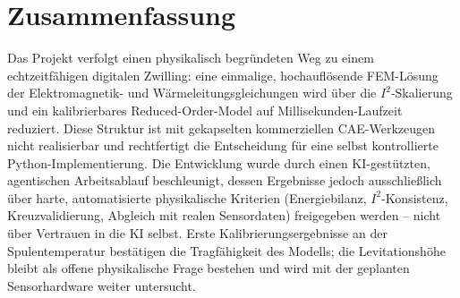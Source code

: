 \documentclass[a4paper,11pt]{article}
\begin{document}
\section{Zusammenfassung}

Das Projekt verfolgt einen physikalisch begründeten Weg zu einem
echtzeitfähigen digitalen Zwilling: eine einmalige, hochauflösende FEM-Lösung
der Elektromagnetik- und Wärmeleitungsgleichungen wird über die
$I^2$-Skalierung und ein kalibrierbares Reduced-Order-Model auf
Millisekunden-Laufzeit reduziert. Diese Struktur ist mit gekapselten
kommerziellen CAE-Werkzeugen nicht realisierbar und rechtfertigt die
Entscheidung für eine selbst kontrollierte Python-Implementierung. Die
Entwicklung wurde durch einen KI-gestützten, agentischen Arbeitsablauf
beschleunigt, dessen Ergebnisse jedoch ausschließlich über harte,
automatisierte physikalische Kriterien (Energiebilanz, $I^2$-Konsistenz,
Kreuzvalidierung, Abgleich mit realen Sensordaten) freigegeben werden --
nicht über Vertrauen in die KI selbst. Erste Kalibrierungsergebnisse an der
Spulentemperatur bestätigen die Tragfähigkeit des Modells; die
Levitationshöhe bleibt als offene physikalische Frage bestehen und wird mit
der geplanten Sensorhardware weiter untersucht.
\end{document}
